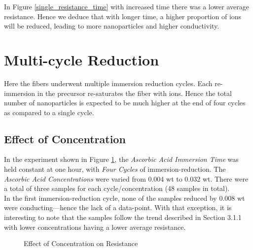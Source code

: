 \documentclass[a4paper, oneside]{discothesis}
\begin{document}
In Figure \ref{single_resistance_time} with increased time there was a lower average resistance. Hence we deduce that with longer time, a higher proportion of  ions will be reduced, leading to more  nanoparticles and higher conductivity.

\pagebreak
\section{Multi-cycle Reduction}
Here the fibers underwent multiple immersion reduction cycles. Each re-immersion in the precursor
re-saturates the fiber with  ions. 
Hence the total number of  nanoparticles is expected to be much higher at the end of four cycles as compared to a single cycle.

\subsection{Effect of Concentration}
In the experiment shown in Figure \ref{multi_resistance_concentration}, the \textit{Ascorbic Acid Immersion Time} was held constant at one hour, with \textit{Four Cycles} of immersion-reduction. The \textit{Ascorbic Acid Concentrations} were varied from 0.004 wt to 0.032 wt. There were a total of three samples for each cycle/concentration (48 samples in total). \\In the first immersion-reduction cycle, none of the samples reduced by 0.008 wt were conducting---hence the lack of a data-point. With that exception, it is interesting to note that the samples follow the trend described in Section 3.1.1 with lower concentrations having a lower average resistance.

\begin{figure}[ht]
    \centering
    \qquad
    \caption{Effect of Concentration on Resistance}%
    \label{multi_resistance_concentration}%
\end{figure}
\end{document}
